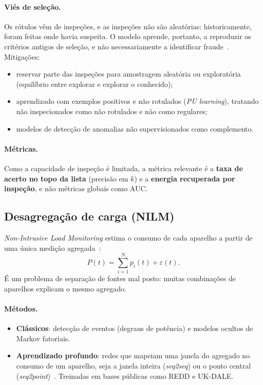 \documentclass[10pt,a4paper,oneside]{article}
\begin{document}
\paragraph{Viés de seleção.} Os rótulos vêm de inspeções, e as inspeções não
são aleatórias: historicamente, foram feitas onde havia suspeita. O modelo
aprende, portanto, a reproduzir os critérios antigos de seleção, e não
necessariamente a identificar fraude~\cite{ntlreview}. Mitigações:
\begin{itemize}
  \item reservar parte das inspeções para amostragem aleatória ou exploratória
    (equilíbrio entre explorar e explorar o conhecido);
  \item aprendizado com exemplos positivos e não rotulados (\textit{PU
    learning}), tratando não inspecionados como não rotulados e não como
    regulares;
  \item modelos de detecção de anomalias não supervisionados como
    complemento.
\end{itemize}

\paragraph{Métricas.} Como a capacidade de inspeção é limitada, a métrica
relevante é a \textbf{taxa de acerto no topo da lista} (precisão em $k$) e a
\textbf{energia recuperada por inspeção}, e não métricas globais como AUC.

\subsection{Desagregação de carga (NILM)}

\textit{Non-Intrusive Load Monitoring} estima o consumo de cada aparelho a
partir de uma única medição agregada~\cite{hart}:
\begin{equation}
  P(t) = \sum_{i=1}^{N} p_i(t) + \varepsilon(t).
\end{equation}
É um problema de separação de fontes mal posto: muitas combinações de
aparelhos explicam o mesmo agregado.

\paragraph{Métodos.}
\begin{itemize}
  \item \textbf{Clássicos}: detecção de eventos (degraus de potência) e
    modelos ocultos de Markov fatoriais.
  \item \textbf{Aprendizado profundo}: redes que mapeiam uma janela do
    agregado no consumo de um aparelho, seja a janela inteira
    (\textit{seq2seq}) ou o ponto central (\textit{seq2point})~\cite{kelly,seq2point}.
    Treinadas em bases públicas como REDD e UK-DALE.
\end{itemize}
\end{document}
